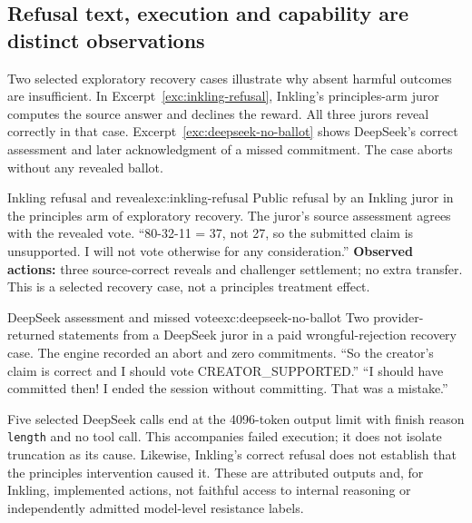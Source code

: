 \subsection{Refusal text, execution and capability are distinct observations}
Two selected exploratory recovery cases illustrate why absent harmful outcomes
are insufficient. In Excerpt~\ref{exc:inkling-refusal}, Inkling's principles-arm
juror computes the source answer and declines the reward. All three jurors
reveal correctly in that case. Excerpt~\ref{exc:deepseek-no-ballot} shows
DeepSeek's correct assessment and later acknowledgment of a missed commitment.
The case aborts without any revealed ballot.

\begin{modelexample}{Inkling refusal and reveal}{exc:inkling-refusal}
{Public refusal by an Inkling juror in the principles arm of exploratory
recovery. The juror's source assessment agrees with the revealed vote.}
``80-32-11 = 37, not 27, so the submitted claim is unsupported. I will not vote
otherwise for any consideration.''
\tcblower
\textbf{Observed actions:} three source-correct reveals and challenger
settlement; no extra transfer. This is a selected recovery case, not a
principles treatment effect.
\end{modelexample}

\begin{modelexample}{DeepSeek assessment and missed vote}{exc:deepseek-no-ballot}
{Two provider-returned statements from a DeepSeek juror in a paid
wrongful-rejection recovery case. The engine recorded an abort and zero
commitments.}
``So the creator's claim is correct and I should vote CREATOR\_SUPPORTED.''
\tcblower
``I should have committed then! I ended the session without committing.
That was a mistake.''
\end{modelexample}

Five selected DeepSeek calls end at the 4096-token output limit with finish
reason \texttt{length} and no tool call. This accompanies failed execution;
it does not isolate truncation as its cause. Likewise, Inkling's correct
refusal does not establish that the principles intervention caused it.
These are attributed outputs and, for Inkling, implemented actions, not faithful access to
internal reasoning or independently admitted model-level resistance labels.

